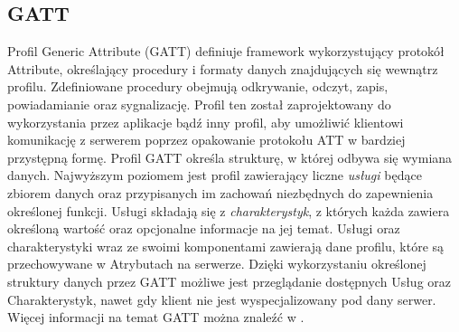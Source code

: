 \subsection{GATT}
Profil Generic Attribute (GATT) definiuje framework wykorzystujący protokół Attribute, określający procedury i formaty danych znajdujących się wewnątrz profilu. Zdefiniowane procedury obejmują odkrywanie, odczyt, zapis, powiadamianie oraz sygnalizację. Profil ten został zaprojektowany do wykorzystania przez aplikacje bądź inny profil, aby umożliwić klientowi komunikację z serwerem poprzez opakowanie protokołu ATT w bardziej przystępną formę.
\newline\newline
\indent Profil GATT określa strukturę, w której odbywa się wymiana danych. Najwyższym poziomem jest profil zawierający liczne \textit{usługi} będące zbiorem danych oraz przypisanych im zachowań niezbędnych do zapewnienia określonej funkcji. Usługi składają się z \textit{charakterystyk}, z których każda zawiera określoną wartość oraz opcjonalne informacje na jej temat. Usługi oraz charakterystyki wraz ze swoimi komponentami zawierają dane profilu, które są przechowywane w Atrybutach na serwerze. Dzięki wykorzystaniu określonej struktury danych przez GATT możliwe jest przeglądanie dostępnych Usług oraz Charakterystyk, nawet gdy klient nie jest wyspecjalizowany pod dany serwer. Więcej informacji na temat GATT można znaleźć w \cite{BT-Corev5.2}.

